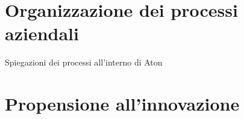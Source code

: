\section{Organizzazione dei processi aziendali}

Spiegazioni dei processi all'interno di Aton


\section{Propensione all'innovazione}





